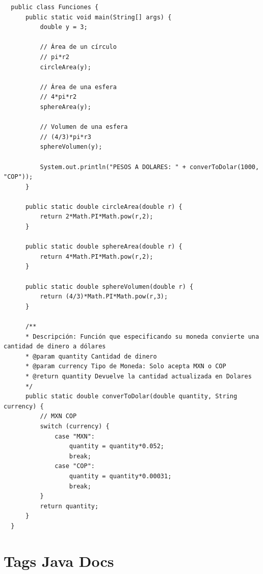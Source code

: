 \documentclass{article}
\begin{document}
\begin{verbatim}
  public class Funciones {
      public static void main(String[] args) {
          double y = 3;

          // Área de un círculo
          // pi*r2
          circleArea(y);

          // Área de una esfera
          // 4*pi*r2
          sphereArea(y);

          // Volumen de una esfera
          // (4/3)*pi*r3
          sphereVolumen(y);

          System.out.println("PESOS A DOLARES: " + converToDolar(1000, "COP"));
      }

      public static double circleArea(double r) {
          return 2*Math.PI*Math.pow(r,2);
      }

      public static double sphereArea(double r) {
          return 4*Math.PI*Math.pow(r,2);
      }

      public static double sphereVolumen(double r) {
          return (4/3)*Math.PI*Math.pow(r,3);
      }

      /**
      * Descripción: Función que especificando su moneda convierte una cantidad de dinero a dólares
      * @param quantity Cantidad de dinero
      * @param currency Tipo de Moneda: Solo acepta MXN o COP
      * @return quantity Devuelve la cantidad actualizada en Dolares
      */
      public static double converToDolar(double quantity, String currency) {
          // MXN COP
          switch (currency) {
              case "MXN":
                  quantity = quantity*0.052;
                  break;
              case "COP":
                  quantity = quantity*0.00031;
                  break;
          }
          return quantity;
      }
  }
\end{verbatim}

\section{Tags Java Docs}%
\end{document}
